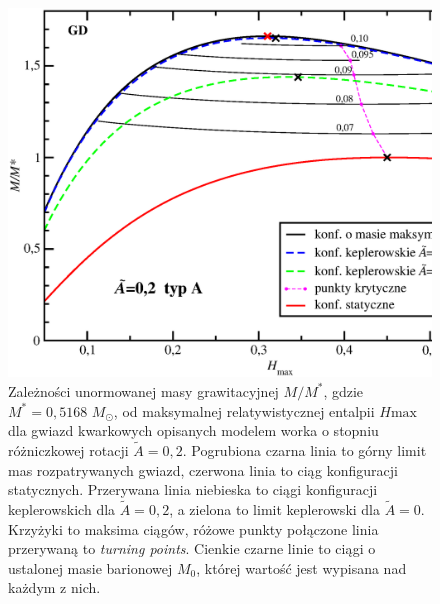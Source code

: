 \documentclass{bachelor_thesis}
\begin{document}
            \begin{figure}[h!]
            \centering
            \includegraphics[scale=.47]{figures/RysMofHstrA02.eps}
            \caption{Zależności unormowanej masy grawitacyjnej $M/M^*$, gdzie $M^*=0,5168$ $M_\odot$, od maksymalnej relatywistycznej entalpii $H\textrm{max}$ dla gwiazd kwarkowych opisanych modelem worka o stopniu różniczkowej rotacji $\tilde{A}=0,2$. Pogrubiona czarna linia to górny limit mas rozpatrywanych gwiazd, czerwona linia to ciąg konfiguracji statycznych. Przerywana linia niebieska to ciągi konfiguracji keplerowskich dla $\tilde{A}=0,2$, a zielona to limit keplerowski dla $\tilde{A}=0$. Krzyżyki to maksima ciągów, różowe punkty połączone linia przerywaną to \textit{turning points}. Cienkie czarne linie to ciągi o ustalonej masie barionowej $M_0$, której wartość jest wypisana nad każdym z nich.}
            \label{RysMofHstrA02}
            \end{figure}
\end{document}
